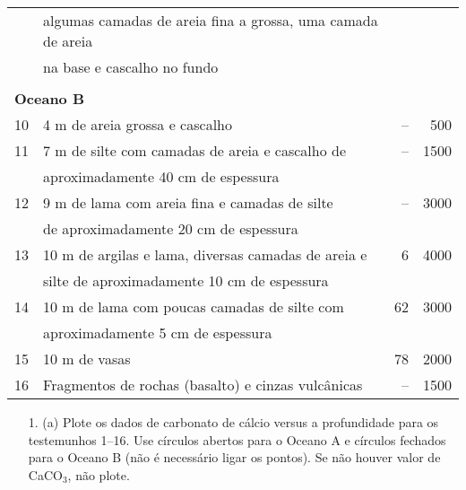 \documentclass[a4paper,10pt]{article}
\begin{document}
{\begin{center}
\begin{tabular}{l l r r}
      & algumas camadas de areia fina a grossa, uma camada de areia     &    &      \\
      & na base e cascalho no fundo                                     &    &      \\
    \multicolumn{4}{l}{\phantom{}} \\
    \multicolumn{4}{l}{{\bf Oceano B}} \\
    10 & 4 m de areia grossa e cascalho                                 & -- &  500 \\
    11 & 7 m de silte com camadas de areia e cascalho de                & -- & 1500 \\
       & aproximadamente 40 cm de espessura                             &    &      \\
    12 & 9 m de lama com areia fina e camadas de silte                  & -- & 3000 \\
       & de aproximadamente 20 cm de espessura                          &    &      \\
    13 & 10 m de argilas e lama, diversas camadas de areia e            &  6 & 4000 \\
       & silte de aproximadamente 10 cm de espessura                    &    &      \\
    14 & 10 m de lama com poucas camadas de silte com                   & 62 & 3000 \\
       & aproximadamente 5 cm de espessura                              &    &      \\
    15 & 10 m de vasas                                                  & 78 & 2000 \\
    16 & Fragmentos de rochas (basalto) e cinzas vulcânicas             & -- & 1500 \\
    \hline
  \end{tabular}
\end{center}
}

\newpage


\def\width{9}
\def\hauteur{8}


\phantom{}

\vspace{2cm}

\begin{center}
  \begin{itemize}
    \item[1. (a)] Plote os dados de carbonato de cálcio versus a profundidade para os testemunhos  1--16. Use círculos abertos para o Oceano A e círculos fechados para o Oceano B (não é necessário ligar os pontos). Se não houver valor de CaCO$_3$, não plote. 
                
  \end{itemize}
\end{center}
\end{document}
